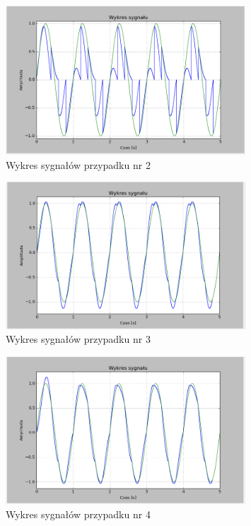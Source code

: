 \documentclass{article}
\begin{document}
    \begin{figure}[h!]
        \centering
        \includegraphics[width=0.8\textwidth]{img/1/sinc2.png}
        \caption{Wykres sygnałów przypadku nr 2}
    \end{figure}
    \FloatBarrier

    \begin{figure}[h!]
        \centering
        \includegraphics[width=0.8\textwidth]{img/1/sinc_3.png}
        \caption{Wykres sygnałów przypadku nr 3}
    \end{figure}
    \FloatBarrier

    \begin{figure}[h!]
        \centering
        \includegraphics[width=0.8\textwidth]{img/1/sinc4.png}
        \caption{Wykres sygnałów przypadku nr 4}
    \end{figure}
    \FloatBarrier
\end{document}
